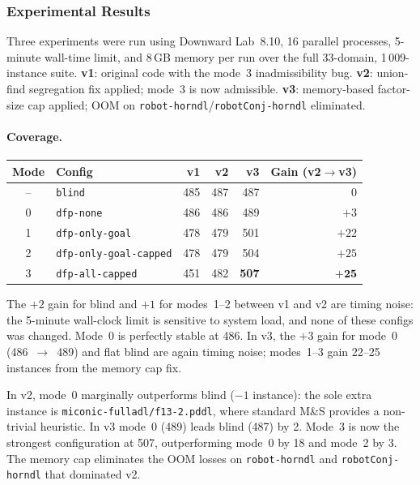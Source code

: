 \documentclass[11pt,a4paper]{article}
\begin{document}
\subsubsection{Experimental Results}
\label{sec:modes-results}

Three experiments were run using Downward Lab~8.10, 16 parallel processes,
5-minute wall-time limit, and 8\,GB memory per run over the full 33-domain,
1\,009-instance suite.
\textbf{v1}: original code with the mode~3 inadmissibility bug.
\textbf{v2}: union-find segregation fix applied; mode~3 is now admissible.
\textbf{v3}: memory-based factor-size cap applied; OOM on \texttt{robot-horndl}/\texttt{robotConj-horndl} eliminated.

\paragraph{Coverage.}

\begin{center}
\small
\begin{tabular}{clrrrr}
\toprule
\textbf{Mode} & \textbf{Config} & \textbf{v1} & \textbf{v2} & \textbf{v3} & \textbf{Gain (v2$\to$v3)} \\
\midrule
 --  & \texttt{blind}                & 485 & 487 & 487 & $0$ \\
  0  & \texttt{dfp-none}             & 486 & 486 & 489 & $+3$ \\
  1  & \texttt{dfp-only-goal}        & 478 & 479 & 501 & $+22$ \\
  2  & \texttt{dfp-only-goal-capped} & 478 & 479 & 504 & $+25$ \\
  3  & \texttt{dfp-all-capped}       & 451 & 482 & \textbf{507} & $\mathbf{+25}$ \\
\bottomrule
\end{tabular}
\end{center}

The $+2$ gain for blind and $+1$ for modes~1--2 between v1 and v2 are timing
noise: the 5-minute wall-clock limit is sensitive to system load, and none of
these configs was changed.  Mode~0 is perfectly stable at 486.
In v3, the $+3$ gain for mode~0 (486~$\to$~489) and flat blind are again
timing noise; modes~1--3 gain 22--25 instances from the memory cap fix.

In v2, mode~0 marginally outperforms blind ($-1$ instance): the sole
extra instance is \texttt{miconic-fulladl/f13-2.pddl}, where standard M\&S
provides a non-trivial heuristic.  In v3 mode~0 (489) leads blind (487) by 2.
Mode~3 is now the strongest configuration at 507, outperforming mode~0 by 18
and mode~2 by 3.  The memory cap eliminates the OOM losses on
\texttt{robot-horndl} and \texttt{robotConj-horndl} that dominated v2.
\end{document}
